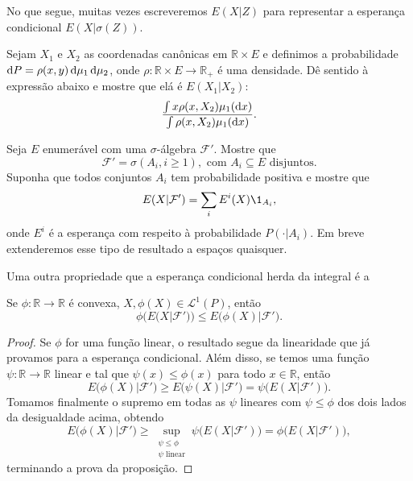 \documentclass[../Notas_de_aula.tex]{subfiles}
\begin{document}
No que segue, muitas vezes escreveremos $E(X|Z)$ para representar a esperança condicional $E(X|\sigma(Z))$.

\begin{exercise}
  Sejam $X_1$ e $X_2$ as coordenadas canônicas em $\mathbb{R} \times E$ e definimos a probabilidade $\mathop{}\!\mathrm{d} P = \rho(x,y) \mathop{}\!\mathrm{d} \mu_1 \mathop{}\!\mathrm{d} \mu_2$, onde $\rho:\mathbb{R} \times E \to \mathbb{R}_+$ é uma densidade.
  Dê sentido à expressão abaixo e mostre que elá é $E(X_1|X_2)$:
  \begin{equation}
     \frac{\int x\rho(x, X_2) \mu_1(\mathop{}\!\mathrm{d} x)}{\int \rho(x, X_2) \mu_1(\mathop{}\!\mathrm{d} x)}.
  \end{equation}
\end{exercise}

\begin{exercise}
  Seja $E$ enumerável com uma $\sigma$-álgebra $\mathcal{F}'$.
  Mostre que
  \begin{equation}
    \mathcal{F}' = \sigma(A_i, i \geq 1), \text{ com $A_i \subseteq E$ disjuntos}.
  \end{equation}
  Suponha que todos conjuntos $A_i$ tem probabilidade positiva e mostre que
  \begin{equation}
    E(X|\mathcal{F}') = \sum_i E^i(X) \1_{A_i},
  \end{equation}
  onde $E^i$ é a esperança com respeito à probabilidade $P(\cdot|A_i)$.
  Em breve extenderemos esse tipo de resultado a espaços quaisquer.
\end{exercise}

Uma outra propriedade que a esperança condicional herda da integral é a

\begin{proposition}
  Se $\phi:\mathbb{R} \to \mathbb{R}$ é convexa, $X, \phi(X) \in \mathcal{L}^1(P)$, então
  \begin{equation}
    \phi\big( E(X|\mathcal{F}') \big) \leq E\big( \phi(X) | \mathcal{F}' \big).
  \end{equation}
\end{proposition}

\begin{proof}
  Se $\phi$ for uma função linear, o resultado segue da linearidade que já provamos para a esperança condicional.
  Além disso, se temos uma função $\psi:\mathbb{R} \to \mathbb{R}$ linear e tal que $\psi(x) \leq \phi(x)$ para todo $x \in \mathbb{R}$, então
  \begin{equation}
    E\big( \phi(X) | \mathcal{F}' \big) \geq E\big( \psi(X) | \mathcal{F}' \big) = \psi \big( E(X|\mathcal{F}') \big).
  \end{equation}
  Tomamos finalmente o supremo em todas as $\psi$ lineares com $\psi \leq \phi$ dos dois lados da desigualdade acima, obtendo
  \begin{equation}
    E\big( \phi(X) | \mathcal{F}' \big) \geq \sup_{\substack{\psi \leq \phi\\\psi \text{ linear}}} \psi \big( E(X|\mathcal{F}') \big) = \phi \big( E(X|\mathcal{F}') \big),
  \end{equation}
  terminando a prova da proposição.
\end{proof}
\end{document}
